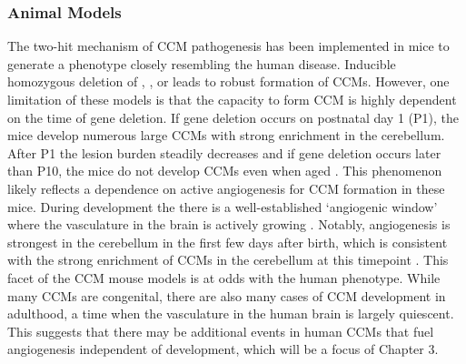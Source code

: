 \subsubsection{Animal Models}
The two-hit mechanism of CCM pathogenesis has been implemented in mice to generate a phenotype closely resembling the human disease. Inducible homozygous deletion of , , or  leads to robust formation of CCMs. However, one limitation of these models is that the capacity to form CCM is highly dependent on the time of gene deletion. If gene deletion occurs on postnatal day 1 (P1), the mice develop numerous large CCMs with strong enrichment in the cerebellum. After P1 the lesion burden steadily decreases and if gene deletion occurs later than P10, the mice do not develop CCMs even when aged \citep{boulday2011, detter2020}. This phenomenon likely reflects a dependence on active angiogenesis for CCM formation in these mice. During development the there is a well-established `angiogenic window' where the vasculature in the brain is actively growing \citep{boulday2009}. Notably, angiogenesis is strongest in the cerebellum in the first few days after birth, which is consistent with the strong enrichment of CCMs in the cerebellum at this timepoint \citep{boulday2009}. This facet of the CCM mouse models is at odds with the human phenotype. While many CCMs are congenital, there are also many cases of CCM development in adulthood, a time when the vasculature in the human brain is largely quiescent. This suggests that there may be additional events in human CCMs that fuel angiogenesis independent of development, which will be a focus of Chapter 3.
